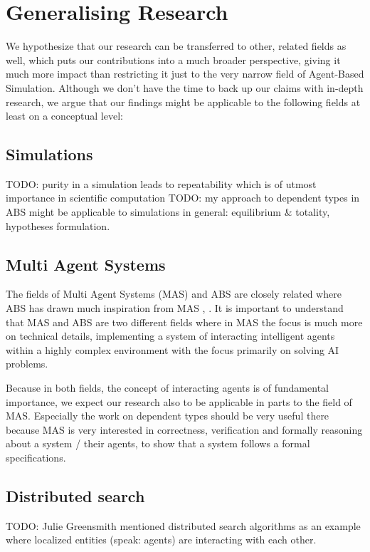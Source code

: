 \chapter{Generalising Research}
\label{chap:generalising}

We hypothesize that our research can be transferred to other, related fields as well, which puts our contributions into a much broader perspective, giving it much more impact than restricting it just to the very narrow field of Agent-Based Simulation. Although we don't have the time to back up our claims with in-depth research, we argue that our findings might be applicable to the following fields at least on a conceptual level:

\section{Simulations}
TODO: purity in a simulation leads to repeatability which is of utmost importance in scientific computation
TODO: my approach to dependent types in ABS might be applicable to simulations in general: equilibrium \& totality, hypotheses formulation. 

\section{Multi Agent Systems}
The fields of Multi Agent Systems (MAS) and ABS are closely related where ABS has drawn much inspiration from MAS \cite{wooldridge_introduction_2009}, \cite{weiss_multiagent_2013}. It is important to understand that MAS and ABS are two different fields where in MAS the focus is much more on technical details, implementing a system of interacting intelligent agents within a highly complex environment with the focus primarily on solving AI problems.

Because in both fields, the concept of interacting agents is of fundamental importance, we expect our research also to be applicable in parts to the field of MAS. Especially the work on dependent types should be very useful there because MAS is very interested in correctness, verification and formally reasoning about a system / their agents, to show that a system follows a formal specifications.

\section{Distributed search}
TODO: Julie Greensmith mentioned distributed search algorithms as an example where localized entities (speak: agents) are interacting with each other.